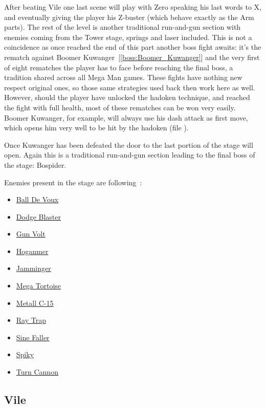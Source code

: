 After beating Vile one last scene will play with Zero speaking his last words to X, and eventually giving the player his Z-buster (which behave exactly as the Arm parts). The rest of the level is another traditional run-and-gun section with enemies coming from the Tower stage, springs and laser included. This is not a coincidence as once reached the end of this part another boss fight awaits: it's the rematch against Boomer Kuwanger~[\ref{boss:Boomer_Kuwanger}] and the very first of eight rematches the player has to face before reaching the final boss, a tradition shared across all Mega Man games. These fights have nothing new respect original ones, so those same strategies used back then work here as well. However, should the player have unlocked the hadoken technique, and reached the fight with full health, most of these rematches can be won very easily. Boomer Kuwanger, for example, will always use his dash attack as first move, which opens him very well to be hit by the hadoken (file ).

Once Kuwanger has been defeated the door to the last portion of the stage will open. Again this is a traditional run-and-gun section leading to the final boss of the stage: Bospider.

Enemies present in the stage are following~\cite{wiki:sigma_stages}:
\begin{itemize}
	\item \hyperlink {enem:Ball_De_Voux}{Ball De Voux}
	\item \hyperlink {enem:Dodge_Blaster}{Dodge Blaster}
	\item \hyperlink {enem:Gun_Volt}{Gun Volt}
	\item \hyperlink {enem:Hoganmer}{Hoganmer}
	\item \hyperlink {enem:Jamminger}{Jamminger}
	\item \hyperlink {enem:Mega_Tortoise}{Mega Tortoise}
	\item \hyperlink {enem:Metall_C-15}{Metall C-15}
	\item \hyperlink {enem:Ray_Trap}{Ray Trap}
	\item \hyperlink {enem:Sine_Faller}{Sine Faller}
	\item \hyperlink {enem:Spiky}{Spiky}
	\item \hyperlink {enem:Turn_Cannon}{Turn Cannon}
\end{itemize}

\subsection{Vile}\label{boss:vile}

